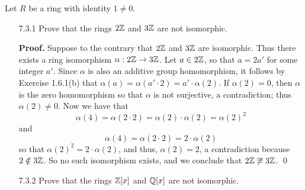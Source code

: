 Let $R$ be a ring with identity $1 \neq 0$.

\begin{enumerate}
   \item[7.3.1]   Prove that the rings $2\mathbb{Z}$ and $3\mathbb{Z}$ are not isomorphic.

      \textbf{Proof.} Suppose to the contrary that $2\mathbb{Z}$ and $3\mathbb{Z}$ are
      isomorphic. Thus there exists a ring isomorphism
      $\alpha : 2\mathbb{Z} \rightarrow 3\mathbb{Z}$. Let $a \in 2\mathbb{Z}$, so that $a = 2a'$ for
      some integer $a'$. Since $\alpha$ is also an additive group homomorphism,
      it follows by Exercise 1.6.1(b) that
      $\alpha(a) = \alpha(a' \cdot 2) = a' \cdot \alpha(2)$. If $\alpha(2) = 0$,
      then $\alpha$ is the zero homomorphism so that $\alpha$ is not surjective,
      a contradiction; thus $\alpha(2) \neq 0$. Now we have that
      $$\alpha(4) = \alpha(2 \cdot 2) = \alpha(2) \cdot
        \alpha(2) = \alpha(2)^2$$
      and
      $$\alpha(4) = \alpha(2 \cdot 2) = 2 \cdot \alpha(2)$$
      so that $\alpha(2)^2 = 2\cdot\alpha(2)$, and thus, $\alpha(2) = 2$, a
      contradiction because $2 \notin 3\mathbb{Z}$. So no such isomorphism exists, and
      we conclude that $2\mathbb{Z} \not\cong 3\mathbb{Z}$. \qed
   \item[7.3.2]   Prove that the rings $\mathbb{Z}[x]$ and $\mathbb{Q}[x]$ are not isomorphic.


\end{enumerate}
